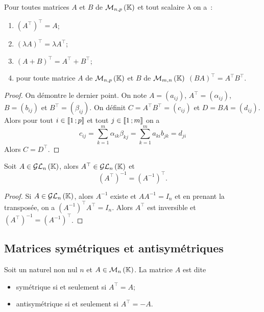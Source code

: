\begin{prop}
  Pour toutes matrices \(A\) et \(B\) de \(\mathcal{M}_{n,p}\left(\mathbb{K}\right)\) et tout scalaire \(\lambda\) on a~:
  \begin{enumerate}
    \item \((A^\top)^\top=A\);
    \item \((\lambda A)^\top=\lambda A^\top\);
    \item \((A+B)^\top=A^\top+B^\top\);
    \item pour toute matrice \(A\) de \(\mathcal{M}_{n,p}\left(\mathbb{K}\right)\) et \(B\) de \(\mathcal{M}_{m,n}\left(\mathbb{K}\right)\) \((BA)^\top=A^\top B^\top\).
  \end{enumerate}
\end{prop}
\begin{proof}
  On démontre le dernier point. On note \(A=(a_{ij})\), \(A^\top =(\alpha_{ij})\), \(B=(b_{ij})\) et \(B^\top =(\beta_{ij})\). On définit \(C=A^\top B^\top = (c_{ij})\) et \(D=BA=(d_{ij})\). Alors pour tout \(i \in \mathopen{\llbracket}1\mathclose{}\mathpunct{};p\mathclose{\rrbracket}\) et tout \(j \in \mathopen{\llbracket}1\mathclose{}\mathpunct{};m\mathclose{\rrbracket}\) on a
  \begin{equation}
    c_{ij}=\sum_{k=1}^m \alpha_{ik}\beta_{kj}=\sum_{k=1}^m a_{ki} b_{jk}=d_{ji}
  \end{equation}
  Alors \(C=D^\top\).
\end{proof}

\begin{prop}
  Soit \(A \in \mathcal{GL}_{n}\left(\mathbb{K}\right)\), alors \(A^\top \in \mathcal{GL}_{n}\left(\mathbb{K}\right)\) et
  \begin{equation}
    (A^\top)^{-1} = (A^{-1})^\top.
  \end{equation}
\end{prop}
\begin{proof}
  Si \(A \in \mathcal{GL}_{n}\left(\mathbb{K}\right)\), alors \(A^{-1}\) existe et \(AA^{-1}=I_n\) et en prenant la transposée, on a \((A^{-1})^\top A^\top=I_n\). Alors \(A^\top\) est inversible et \((A^\top)^{-1} = (A^{-1})^\top\).
\end{proof}

\subsection{Matrices symétriques et antisymétriques}

Soit un naturel non nul \(n\) et \(A \in \mathcal{M}_{n}\left(\mathbb{K}\right)\). La matrice \(A\) est dite
\begin{itemize}
  \item symétrique si et seulement si \(A^\top=A\);
  \item antisymétrique si et seulement si \(A^\top=-A\).
\end{itemize}

